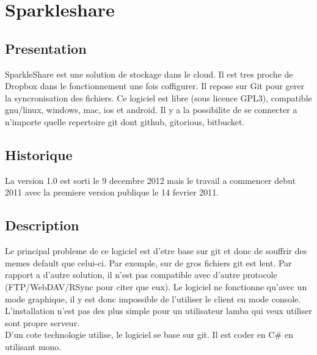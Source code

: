 \chapter{Sparkleshare}
\thispagestyle{EIP} %
\section{Presentation}
SparkleShare est une solution de stockage dans le cloud. Il est tres proche de Dropbox dans le fonctionnement une fois coffigurer. Il repose sur Git pour gerer la syncronisation des fichiers. Ce logiciel est libre (sous licence GPL3), compatible gnu/linux, windows, mac, ios et android. Il y a la possibilite de se connecter a n'importe quelle repertoire git dont github, gitorious, bitbucket.\\

\section{Historique}
La version 1.0 est sorti le 9 decembre 2012 mais le travail a commencer debut 2011 avec la premiere version publique le 14 fevrier 2011.\\

\section{Description}
Le principal probleme de ce logiciel est d'etre base sur git et donc de souffrir des memes default que celui-ci. Par exemple, sur de gros fichiers git est lent. Par rapport a d'autre solution, il n'est pas compatible avec d'autre protocole (FTP/WebDAV/RSync pour citer que eux). Le logiciel ne fonctionne qu'avec un mode graphique, il y est donc impossible de l'utiliser le client en mode console. L'installation n'est pas des plus simple pour un utilisateur lamba qui veux utiliser sont propre serveur.\\

D'un cote technologie utilise, le logiciel se base sur git. Il est coder en C\# en utilisant mono.\\
